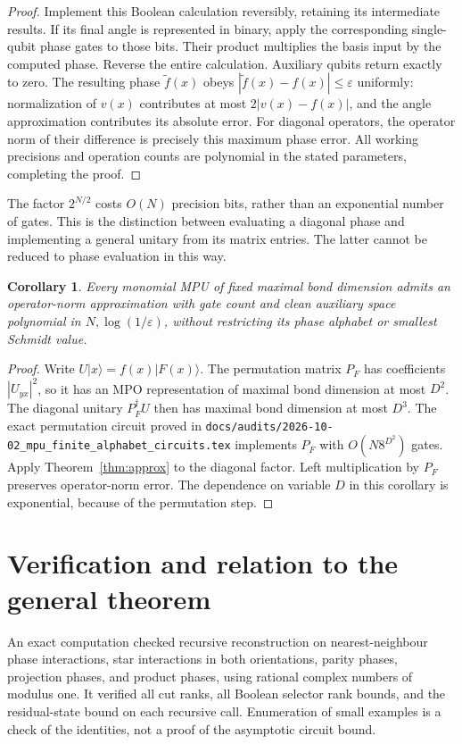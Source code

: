 \documentclass[11pt]{article}
\newtheorem{corollary}[lemma]{Corollary}
\begin{document}
\begin{proof}
Implement this Boolean calculation reversibly, retaining its intermediate
results. If its final angle is represented in binary, apply the
corresponding single-qubit phase gates to those bits. Their product
multiplies the basis input by the computed phase. Reverse the entire
calculation. Auxiliary qubits return exactly to zero. The resulting
phase $\widetilde f(x)$ obeys
$|\widetilde f(x)-f(x)|\leq\varepsilon$ uniformly: normalization of
$v(x)$ contributes at most $2|v(x)-f(x)|$, and the angle approximation
contributes its absolute error. For diagonal operators, the operator
norm of their difference is precisely this maximum phase error.
All working precisions and operation counts are polynomial in the
stated parameters, completing the proof.
\end{proof}

The factor $2^{N/2}$ costs $O(N)$ precision bits, rather than an
exponential number of gates. This is the distinction between evaluating
a diagonal phase and implementing a general unitary from its matrix
entries. The latter cannot be reduced to phase evaluation in this way.

\begin{corollary}\label{cor:monomial}
Every monomial MPU of fixed maximal bond dimension admits an
operator-norm approximation with gate count and clean auxiliary space
polynomial in $N,\log(1/\varepsilon)$, without restricting its phase
alphabet or smallest Schmidt value.
\end{corollary}
\begin{proof}
Write $U|x\rangle=f(x)|F(x)\rangle$. The permutation matrix $P_F$ has
coefficients $|U_{yx}|^2$, so it has an MPO representation of maximal
bond dimension at most $D^2$. The diagonal unitary $P_F^\dagger U$
then has maximal bond dimension at most $D^3$. The exact permutation
circuit proved in
\nolinkurl{docs/audits/2026-10-02_mpu_finite_alphabet_circuits.tex}
implements $P_F$ with $O(N8^{D^2})$ gates. Apply
Theorem~\ref{thm:approx} to the diagonal factor. Left multiplication
by $P_F$ preserves operator-norm error. The dependence on variable $D$
in this corollary is exponential, because of the permutation step.
\end{proof}

\section{Verification and relation to the general theorem}

An exact computation checked
recursive reconstruction on nearest-neighbour phase interactions,
star interactions in both orientations, parity phases, projection phases, and product phases,
using rational complex numbers of modulus one. It verified all cut ranks,
all Boolean selector rank bounds, and the residual-state bound on each
recursive call. Enumeration of small examples is a check of the
identities, not a proof of the asymptotic circuit bound.
\end{document}
